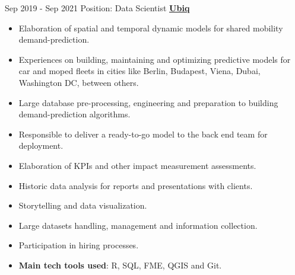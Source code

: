 \documentclass[letterpaper]{twentysecondcv} %
\begin{document}
\begin{twenty}
\twentyitem
    	{Sep 2019 -}
		{Sep 2021}
        {Position: Data Scientist } 
        {\href{http://www.ubiq.ai/}{\normalsize \textbf{\underline{Ubiq}}}}
        {}
        {\begin{itemize}
        \item Elaboration of spatial and temporal dynamic models for shared mobility demand-prediction. 
        \item Experiences on building, maintaining and optimizing predictive models for car and moped fleets in cities like Berlin, Budapest, Viena, Dubai, Washington DC, between others. \item Large database pre-processing, engineering and preparation to building demand-prediction algorithms.
        \item Responsible to deliver a ready-to-go model to the back end team for deployment.
        \item Elaboration of KPIs and other impact measurement assessments.
        \item Historic data analysis for reports and presentations with clients.
        \item Storytelling and data visualization.
        \item Large datasets handling, management and information collection. 
        \item Participation in hiring processes. 
        \item \textbf{Main tech tools used}: R, SQL, FME, QGIS and Git.
        \end{itemize}}
        \\
	
     \\
        
\end{twenty}
\end{document}
